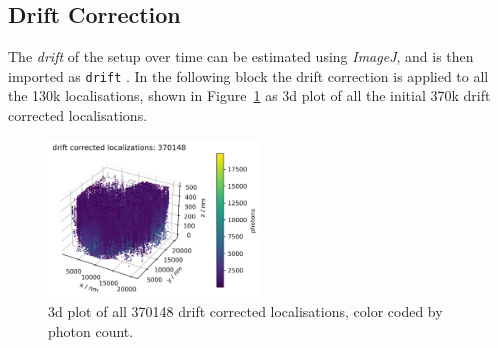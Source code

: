 \documentclass[11pt, a4paper, oneside, twocolumn]{report}
\renewcommand{\tt}{\texttt}
\renewcommand{\t}{\todo}
\newcommand{\e}{\emph}
\begin{document}
  

\subsection{Drift Correction}

The \e{drift} of the setup over time can be estimated using
\e{ImageJ}, and is then imported as \tt{drift} \t{drift}. In the
following block the drift correction is applied to all the 130k
localisations, shown in Figure~\ref{f:2_drift} as 3d plot of all the
initial 370k drift corrected localisations.






\begin{figure}[h]
  \centering
  \includegraphics[width=0.5\textwidth]{2_drift.png}
  \caption{3d plot of all 370148 drift corrected localisations, color
    coded by photon count.}
  \label{f:2_drift}
\end{figure}
\end{document}
